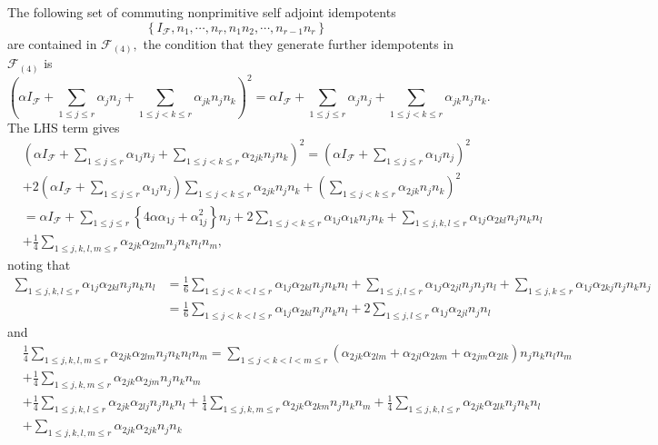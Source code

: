 \documentclass[aps,preprint]{revtex4}%
\begin{document}
The following set of commuting nonprimitive self adjoint idempotents
\begin{equation}
\left\{  I_{\mathcal{F}},n_{1},\cdots,n_{r},n_{1}n_{2},\cdots,n_{r-1}%
n_{r}\right\}
\end{equation}
are contained in $\mathcal{F}_{\left(  4\right)  },$ the condition that they
generate further idempotents in $\mathcal{F}_{\left(  4\right)  }$ is
\begin{equation}
\left(  \alpha I_{\mathcal{F}}+\sum_{1\leq j\leq r}\alpha_{j}n_{j}+\sum_{1\leq
j<k\leq r}\alpha_{jk}n_{j}n_{k}\right)  ^{2}=\alpha I_{\mathcal{F}}%
+\sum_{1\leq j\leq r}\alpha_{j}n_{j}+\sum_{1\leq j<k\leq r}\alpha_{jk}%
n_{j}n_{k}.
\end{equation}
The LHS term gives
\begin{align}
&  \left(  \alpha I_{\mathcal{F}}+\sum_{1\leq j\leq r}\alpha_{1j}n_{j}%
+\sum_{1\leq j<k\leq r}\alpha_{2jk}n_{j}n_{k}\right)  ^{2}=\left(  \alpha
I_{\mathcal{F}}+\sum_{1\leq j\leq r}\alpha_{1j}n_{j}\right)  ^{2}\nonumber\\
&  +2\left(  \alpha I_{\mathcal{F}}+\sum_{1\leq j\leq r}\alpha_{1j}%
n_{j}\right)  \sum_{1\leq j<k\leq r}\alpha_{2jk}n_{j}n_{k}+\left(  \sum_{1\leq
j<k\leq r}\alpha_{2jk}n_{j}n_{k}\right)  ^{2}\nonumber\\
&  =\alpha I_{\mathcal{F}}+\sum_{1\leq j\leq r}\left\{  4\alpha\alpha
_{1j}+\alpha_{1j}^{2}\right\}  n_{j}+2\sum_{1\leq j<k\leq r}\alpha_{1j}%
\alpha_{1k}n_{j}n_{k}+\sum_{1\leq j,k,l\leq r}\alpha_{1j}\alpha_{2kl}%
n_{j}n_{k}n_{l}\nonumber\\
&  +\frac{1}{4}\sum_{1\leq j,k,l,m\leq r}\alpha_{2jk}\alpha_{2lm}n_{j}%
n_{k}n_{l}n_{m},
\end{align}
noting that
\begin{align}
\sum_{1\leq j,k,l\leq r}\alpha_{1j}\alpha_{2kl}n_{j}n_{k}n_{l}  &  =\frac
{1}{6}\sum_{1\leq j<k<l\leq r}\alpha_{1j}\alpha_{2kl}n_{j}n_{k}n_{l}%
+\sum_{1\leq j,l\leq r}\alpha_{1j}\alpha_{2jl}n_{j}n_{j}n_{l}+\sum_{1\leq
j,k\leq r}\alpha_{1j}\alpha_{2kj}n_{j}n_{k}n_{j}\nonumber\\
&  =\frac{1}{6}\sum_{1\leq j<k<l\leq r}\alpha_{1j}\alpha_{2kl}n_{j}n_{k}%
n_{l}+2\sum_{1\leq j,l\leq r}\alpha_{1j}\alpha_{2jl}n_{j}n_{l}%
\end{align}
and
\begin{align}
&  \frac{1}{4}\sum_{1\leq j,k,l,m\leq r}\alpha_{2jk}\alpha_{2lm}n_{j}%
n_{k}n_{l}n_{m}=\sum_{1\leq j<k<l<m\leq r}\left(  \alpha_{2jk}\alpha
_{2lm}+\alpha_{2jl}\alpha_{2km}+\alpha_{2jm}\alpha_{2lk}\right)  n_{j}%
n_{k}n_{l}n_{m}\nonumber\\
&  +\frac{1}{4}\sum_{1\leq j,k,m\leq r}\alpha_{2jk}\alpha_{2jm}n_{j}n_{k}%
n_{m}\nonumber\\
&  +\frac{1}{4}\sum_{1\leq j,k,l\leq r}\alpha_{2jk}\alpha_{2lj}n_{j}n_{k}%
n_{l}+\frac{1}{4}\sum_{1\leq j,k,m\leq r}\alpha_{2jk}\alpha_{2km}n_{j}%
n_{k}n_{m}+\frac{1}{4}\sum_{1\leq j,k,l\leq r}\alpha_{2jk}\alpha_{2lk}%
n_{j}n_{k}n_{l}\nonumber\\
&  +\sum_{1\leq j,k,l,m\leq r}\alpha_{2jk}\alpha_{2jk}n_{j}n_{k}%
\end{align}
\end{document}
